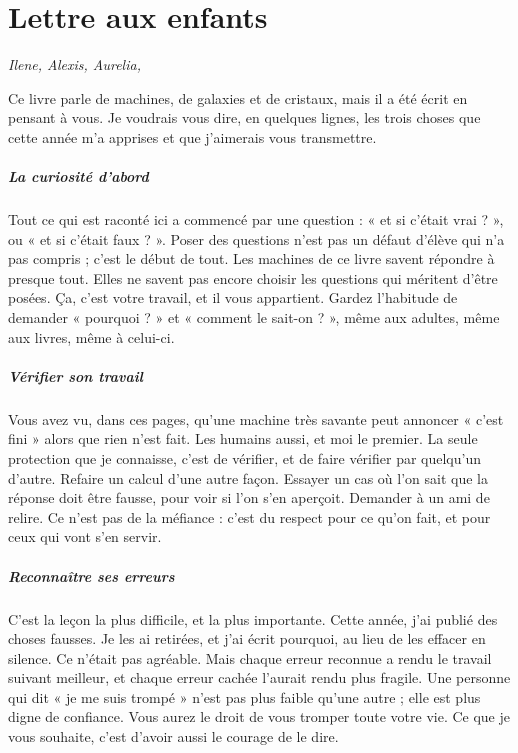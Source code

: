\chapter*{Lettre aux enfants}

\noindent\emph{Ilene, Alexis, Aurelia,}

\medskip
Ce livre parle de machines, de galaxies et de cristaux, mais il a été écrit en pensant à vous. Je voudrais vous dire,
en quelques lignes, les trois choses que cette année m'a apprises et que j'aimerais vous transmettre.

\paragraph{La curiosité d'abord} Tout ce qui est raconté ici a commencé par une question : « et si c'était vrai ? »,
ou « et si c'était faux ? ». Poser des questions n'est pas un défaut d'élève qui n'a pas compris ; c'est le début de
tout. Les machines de ce livre savent répondre à presque tout. Elles ne savent pas encore choisir les questions qui
méritent d'être posées. Ça, c'est votre travail, et il vous appartient. Gardez l'habitude de demander « pourquoi ? »
et « comment le sait-on ? », même aux adultes, même aux livres, même à celui-ci.

\paragraph{Vérifier son travail} Vous avez vu, dans ces pages, qu'une machine très savante peut annoncer « c'est
fini » alors que rien n'est fait. Les humains aussi, et moi le premier. La seule protection que je connaisse, c'est
de vérifier, et de faire vérifier par quelqu'un d'autre. Refaire un calcul d'une autre façon. Essayer un cas où l'on
sait que la réponse doit être fausse, pour voir si l'on s'en aperçoit. Demander à un ami de relire. Ce n'est pas
de la méfiance : c'est du respect pour ce qu'on fait, et pour ceux qui vont s'en servir.

\paragraph{Reconnaître ses erreurs} C'est la leçon la plus difficile, et la plus importante. Cette année, j'ai
publié des choses fausses. Je les ai retirées, et j'ai écrit pourquoi, au lieu de les effacer en silence. Ce n'était
pas agréable. Mais chaque erreur reconnue a rendu le travail suivant meilleur, et chaque erreur cachée l'aurait rendu
plus fragile. Une personne qui dit « je me suis trompé » n'est pas plus faible qu'une autre ; elle est plus digne de
confiance. Vous aurez le droit de vous tromper toute votre vie. Ce que je vous souhaite, c'est d'avoir aussi le
courage de le dire.

